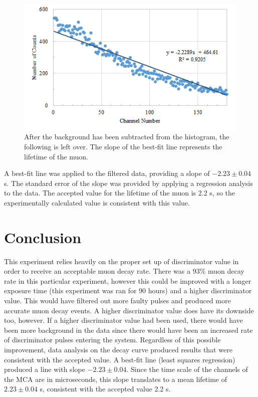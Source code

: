 \documentclass[%
 aip,
 amsmath,amssymb,
 reprint,%
floatfix,
]{revtex4-1}
\begin{document}
\begin{figure}[H]
	\centering
	\includegraphics[scale=0.8]{filtered.png}
	\caption{After the background has been subtracted from the histogram, the following is left over. The slope of the best-fit line represents the lifetime of the muon.}
\end{figure}

A best-fit line was applied to the filtered data, providing a slope of $-2.23 \pm 0.04$ \textmu s. The standard error of the slope was provided by applying a regression analysis to the data. The accepted value for the lifetime of the muon is 2.2 \textmu s, so the experimentally calculated value is consistent with this value.


\section{\label{sec:level5}Conclusion}

This experiment relies heavily on the proper set up of discriminator value in order to receive an acceptable muon decay rate. There was a 93\% muon decay rate in this particular experiment, however this could be improved with a longer exposure time (this experiment was ran for 90 hours) and a higher discriminator value. This would have filtered out more faulty pulses and produced more accurate muon decay events. A higher discriminator value does have its downside too, however. If a higher discriminator value had been used, there would have been more background in the data since there would have been an increased rate of discriminator pulses entering the system. Regardless of this possible improvement, data analysis on the decay curve produced results that were consistent with the accepted value. A best-fit line (least squares regression) produced a line with slope $-2.23 \pm 0.04$. Since the time scale of the channels of the MCA are in microseconds, this slope translates to a mean lifetime of $2.23 \pm 0.04$ \textmu s, consistent with the accepted value 2.2 \textmu s.

\nocite{*}
\end{document}
